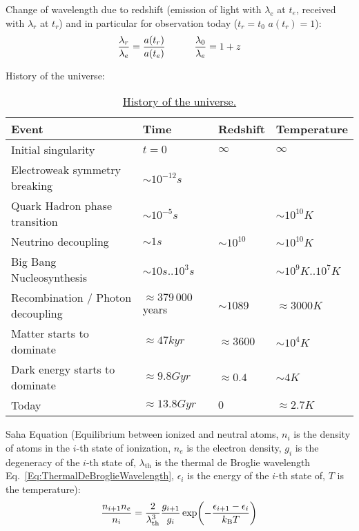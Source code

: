 			\noindent
			Change of wavelength due to redshift (emission of light with $\lambda_e$ at $t_e$, received with $\lambda_r$ at $t_r$) and in particular for observation today ($t_r=t_0$ \ie $a(t_r)=1$):
			\begin{equation}
				\frac{\lambda_r}{\lambda_e} = \frac{a(t_r)}{a(t_e)}
				\hspace{30pt}
				\frac{\lambda_0}{\lambda_e} = 1+z
			\end{equation}

			\noindent
			History of the universe:
			\begin{table}[ht]
				\begin{center}
					\begin{tabular}{ l | l | l | l }
						Event & Time & Redshift & Temperature \\ \hline
						Initial singularity & $t=0$ & $\infty$ & $\infty$ \\
						Electroweak symmetry breaking & $\sim 10^{-12}\unit{s}$ & & \\
						Quark Hadron phase transition & $\sim 10^{-5}\unit{s}$ & & $\sim 10^{10}\unit{K}$ \\
						Neutrino decoupling & $\sim 1\unit{s}$ & $\sim 10^{10}$ & $\sim 10^{10}\unit{K}$ \\
						Big Bang Nucleosynthesis & $\sim 10 \unit{s}..10^3\unit{s}$ & & $\sim 10^9\unit{K}..10^7\unit{K}$ \\
						Recombination / Photon decoupling & $\approx 379\,000$ years & $\sim 1089$ & $\approx 3000\unit{K}$ \\
						Matter starts to dominate & $\approx 47\unit{kyr}$ & $\approx 3600$ & $\sim 10^4\unit{K}$ \\
						Dark energy starts to dominate & $\approx 9.8\unit{Gyr}$ & $\approx 0.4$ & $\sim 4\unit{K}$ \\
						Today & $\approx 13.8\unit{Gyr}$ & $0$ & $\approx 2.7\unit{K}$ \\
					\end{tabular}
					\caption{\href{https://en.wikipedia.org/wiki/Chronology_of_the_universe}{History of the universe.}}
				\end{center}
			\end{table}

			\noindent
			Saha Equation (Equilibrium between ionized and neutral atoms, $n_i$ is the density of atoms in the $i$-th state of ionization, $n_e$ is the electron density, $g_i$ is the degeneracy of the $i$-th state of, $\lambda_\text{th}$ is the thermal de Broglie wavelength Eq.~\ref{Eq:ThermalDeBroglieWavelength}, $\epsilon_i$ is the energy of the $i$-th state of, $T$ is the temperature):
			\begin{equation}
				\frac{n_{i+1} n_e}{n_i} = \frac{2}{\lambda_\text{th}^3} \frac{g_{i+1}}{g_i} \exp(- \frac{\epsilon_{i+1}-\epsilon_{i}}{k_{\text{B}} T})
			\end{equation}


